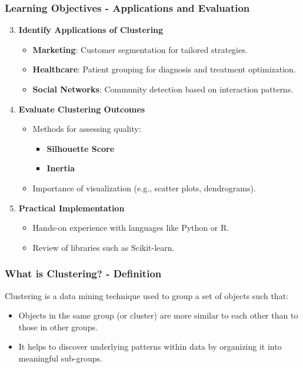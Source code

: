 \documentclass{beamer}
\begin{document}
\begin{frame}[fragile]
    \frametitle{Learning Objectives - Applications and Evaluation}
    \begin{enumerate}\setcounter{enumi}{2}
        \item \textbf{Identify Applications of Clustering}
            \begin{itemize}
                \item \textbf{Marketing}: Customer segmentation for tailored strategies.
                \item \textbf{Healthcare}: Patient grouping for diagnosis and treatment optimization.
                \item \textbf{Social Networks}: Community detection based on interaction patterns.
            \end{itemize}
        \item \textbf{Evaluate Clustering Outcomes}
            \begin{itemize}
                \item Methods for assessing quality:
                    \begin{itemize}
                        \item \textbf{Silhouette Score}
                        \item \textbf{Inertia}
                    \end{itemize}
                \item Importance of visualization (e.g., scatter plots, dendrograms).
            \end{itemize}
        \item \textbf{Practical Implementation}
            \begin{itemize}
                \item Hands-on experience with languages like Python or R.
                \item Review of libraries such as Scikit-learn.
            \end{itemize}
    \end{enumerate}
\end{frame}

\begin{frame}[fragile]
    \frametitle{What is Clustering? - Definition}
    Clustering is a data mining technique used to group a set of objects such that:
    \begin{itemize}
        \item Objects in the same group (or cluster) are more similar to each other than to those in other groups.
        \item It helps to discover underlying patterns within data by organizing it into meaningful sub-groups.
    \end{itemize}
\end{frame}
\end{document}
